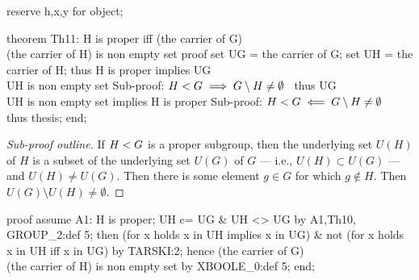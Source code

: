 \nwenddocs{}\endmoddef\nwstartdeflinemarkup{}\nwenddeflinemarkup
reserve h,x,y for object;

theorem Th11:
  H is proper iff (the carrier of G) \\ (the carrier of H) is non empty set
proof
  set UG = the carrier of G;
  set UH = the carrier of H;
  thus H is proper implies UG \\ UH is non empty set
  \LA{}Sub-proof: $H< G\implies G\setminus H\neq\emptyset$~{\nwtagstyle{}}\RA{}
  thus UG \\ UH is non empty set implies H is proper
  \LA{}Sub-proof: $H< G\impliedby G\setminus H\neq\emptyset$~{\nwtagstyle{}}\RA{}
  thus thesis;
end;
\eatline
{}\nwendcode{}\nwdocspar
\begin{proof}[Sub-proof outline]
  If $H< G$ is a proper subgroup, then the underlying set
  $U(H)$ of $H$ is a subset of the underlying set $U(G)$ of $G$ --- i.e.,
  $U(H)\subset U(G)$ --- and $U(H)\neq U(G)$. Then there is some element
  $g\in G$ for which $g\notin H$. Then $U(G)\setminus U(H)\neq\emptyset$.
\end{proof}

\nwenddocs{}\endmoddef\nwstartdeflinemarkup{}\nwenddeflinemarkup
proof
  assume A1: H is proper;
  UH c= UG & UH <> UG by A1,Th10, GROUP_2:def 5;
  then (for x holds x in UH implies x in UG) &
  not (for x holds x in UH iff x in UG) by TARSKI:2;
  hence (the carrier of G) \\ (the carrier of H) is non empty set
  by XBOOLE_0:def 5;
end;
\nwendcode{}\nwdocspar

